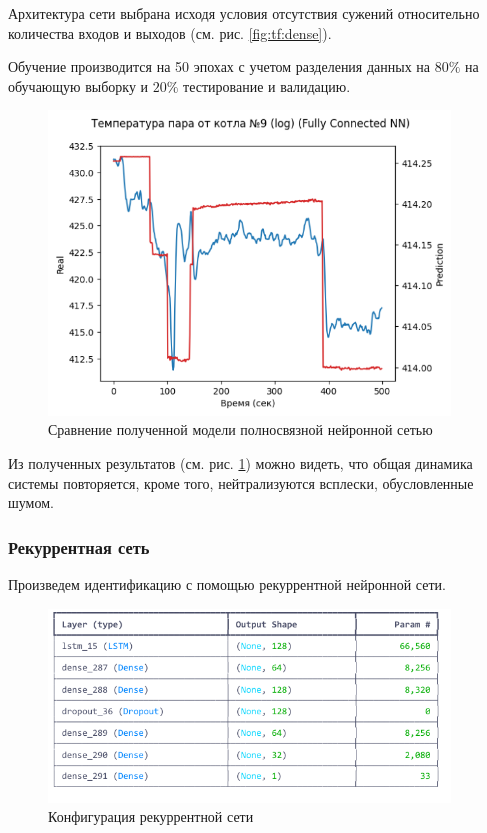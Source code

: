 Архитектура сети выбрана исходя условия отсутствия
сужений относительно количества входов и выходов (см.
рис. \ref{fig:tf:dense}). 

Обучение производится на 50 эпохах с учетом
разделения данных на $80\%$ на обучающую выборку и
$20\%$ тестирование и валидацию. 

\begin{figure}[H]
  \begin{center}
    \includegraphics[width=0.95\textwidth]{figures/tensorflow/dense_compare.png}
  \end{center}
  \caption{Сравнение полученной модели полносвязной нейронной сетью}\label{fig:tf:cmp:dense}
\end{figure}

Из полученных результатов (см. рис. \ref{fig:tf:cmp:dense}) можно видеть, что
общая динамика системы повторяется, кроме того, нейтрализуются всплески,
обусловленные шумом. 

\subsubsection{Рекуррентная сеть}

Произведем идентификацию с помощью рекуррентной
нейронной сети. 

\begin{figure}[H]
  \begin{center}
    \includegraphics[width=0.95\textwidth]{figures/tensorflow/rnn.png}
  \end{center}
  \caption{Конфигурация рекуррентной сети}\label{fig:tf:rnn}
\end{figure}


